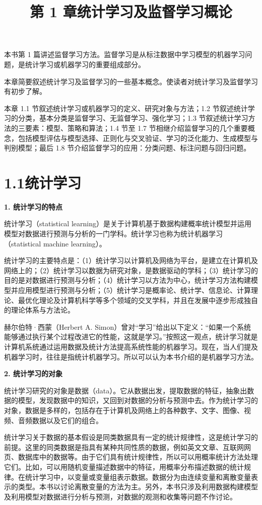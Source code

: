 \documentclass[UTF8,12pt,a4paper,fontset=fandol]{ctexart}
\title{第 1 章\quad 统计学习及监督学习概论}
\author{}
\date{}
\begin{document}
\maketitle

本书第 1 篇讲述监督学习方法。监督学习是从标注数据中学习模型的机器学习问题，是统计学习或机器学习的重要组成部分。

本章简要叙述统计学习及监督学习的一些基本概念。使读者对统计学习及监督学习有初步了解。

本章 1.1 节叙述统计学习或机器学习的定义、研究对象与方法；1.2 节叙述统计学习的分类，基本分类是监督学习、无监督学习、强化学习；1.3 节叙述统计学习方法的三要素：模型、策略和算法；1.4 节至 1.7 节相继介绍监督学习的几个重要概念，包括模型评估与模型选择、正则化与交叉验证、学习的泛化能力、生成模型与判别模型；最后 1.8 节介绍监督学习的应用：分类问题、标注问题与回归问题。

\section*{1.1\quad 统计学习}

\noindent\textbf{1. 统计学习的特点}

统计学习（statistical learning）是关于计算机基于数据构建概率统计模型并运用模型对数据进行预测与分析的一门学科。统计学习也称为统计机器学习（statistical machine learning）。

统计学习的主要特点是：（1）统计学习以计算机及网络为平台，是建立在计算机及网络上的；（2）统计学习以数据为研究对象，是数据驱动的学科；（3）统计学习的目的是对数据进行预测与分析；（4）统计学习以方法为中心，统计学习方法构建模型并应用模型进行预测与分析；（5）统计学习是概率论、统计学、信息论、计算理论、最优化理论及计算机科学等多个领域的交叉学科，并且在发展中逐步形成独自的理论体系与方法论。

赫尔伯特·西蒙（Herbert A. Simon）曾对“学习”给出以下定义：“如果一个系统能够通过执行某个过程改进它的性能，这就是学习。”按照这一观点，统计学习就是计算机系统通过运用数据及统计方法提高系统性能的机器学习。现在，当人们提及机器学习时，往往是指统计机器学习。所以可以认为本书介绍的是机器学习方法。

\noindent\textbf{2. 统计学习的对象}

统计学习研究的对象是数据（data）。它从数据出发，提取数据的特征，抽象出数据的模型，发现数据中的知识，又回到对数据的分析与预测中去。作为统计学习的对象，数据是多样的，包括存在于计算机及网络上的各种数字、文字、图像、视频、音频数据以及它们的组合。

统计学习关于数据的基本假设是同类数据具有一定的统计规律性，这是统计学习的前提。这里的同类数据是指具有某种共同性质的数据，例如英文文章、互联网网页、数据库中的数据等。由于它们具有统计规律性，所以可以用概率统计方法处理它们。比如，可以用随机变量描述数据中的特征，用概率分布描述数据的统计规律。在统计学习中，以变量或变量组表示数据。数据分为由连续变量和离散变量表示的类型。本书以讨论离散变量的方法为主。另外，本书只涉及利用数据构建模型及利用模型对数据进行分析与预测，对数据的观测和收集等问题不作讨论。
\end{document}
